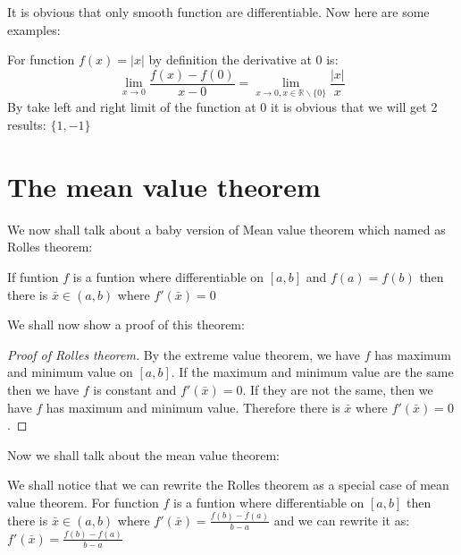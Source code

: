 \documentclass{article}
\newcommand{\R}{\mathbb{R}}
\begin{document}
It is obvious that only smooth function are differentiable. Now here are some examples:
\begin{example}
	For function $f(x)=|x|$ by definition the derivative at 0 is:
	\begin{equation*}
		\lim_{x\to 0}\frac{f(x)-f(0)}{x-0}=\lim_{x\to 0,x\in \R \backslash \{0\}} \frac{|x|}{x}
	\end{equation*}
By take left and right limit of the function at 0 it is obvious that we will get 2 results: $\{1,-1\}$
\end{example}

\section{The mean value theorem}
We now shall talk about a baby version of Mean value theorem which named as Rolles theorem:
\begin{theorem}
   If funtion $f$ is a funtion where differentiable on $[a,b]$ and $f(a)=f(b)$ then there is $\bar{x}\in (a,b)$ where $f'(\bar{x})=0$
\end{theorem}
We shall now show a proof of this theorem:
\begin{proof}[Proof of Rolles theorem]
  By the extreme value theorem, we have $f$ has maximum and minimum value on $[a,b]$. If the maximum and minimum value are the same then we have $f$ is constant and $f'(\bar{x})=0$. If they are not the same,
  then we have $f$ has maximum and minimum value. Therefore there is $\bar{x}$ where $f'(\bar{x})=0$.
\end{proof}
Now we shall talk about the mean value theorem:
  \begin{theorem}
We shall notice that we can rewrite the Rolles theorem as a special case of mean value theorem.
For function $f$ is a funtion where differentiable on $[a,b]$ then there is $\bar{x}\in (a,b)$
where $f'(\bar{x})=\frac{f(b)-f(a)}{b-a}$ and we can rewrite it as: $f'(\bar{x})=\frac{f(b)-f(a)}{b-a}$
\end{theorem}
\end{document}
